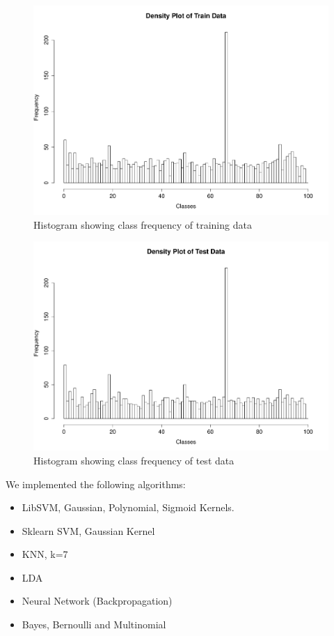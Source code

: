 \documentclass[a4paper]{article}
\begin{document}
\begin{figure}[H]
	\centering
	\includegraphics[width=1\textwidth]{../plots/TrainData_targets}
	\caption{\label{fig:data} Histogram showing class frequency of training data}
\end{figure}

\begin{figure}[H]
	\centering
	\includegraphics[width=1\textwidth]{../plots/TestData_targets}
	\caption{\label{fig:data} Histogram showing class frequency of test data}
\end{figure}

We implemented the following algorithms:
\begin{itemize}
\item LibSVM, Gaussian, Polynomial, Sigmoid Kernels.
\item Sklearn SVM, Gaussian Kernel
\item KNN, k=7 
\item LDA
\item Neural Network (Backpropagation)
\item Bayes, Bernoulli and Multinomial
\end{itemize}
\end{document}
